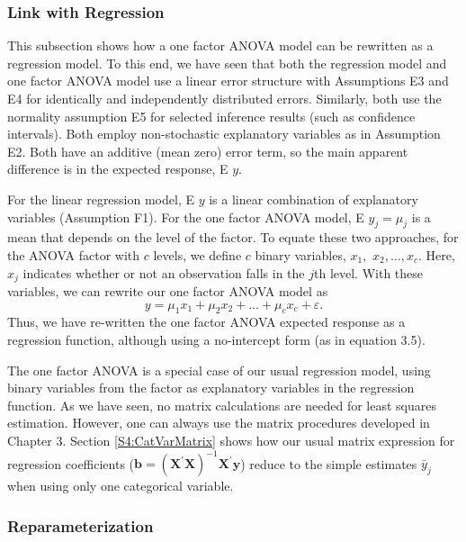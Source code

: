 \subsubsection*{Link with Regression}

This subsection shows how a one factor ANOVA model can be rewritten
as a regression model. To this end, we have seen that both the
regression model and one factor ANOVA model use a linear error
structure with Assumptions E3 and E4 for identically and
independently distributed errors. Similarly, both use the normality
assumption E5 for selected inference results (such as confidence
intervals). Both employ non-stochastic explanatory variables as in
Assumption E2. Both have an additive (mean zero) error term, so the
main apparent difference is in the expected response, E $y$.

For the linear regression model, E $y$ is a linear combination of
explanatory variables (Assumption F1). For the one factor ANOVA
model, E $y_j = \mu_j$ is a mean that depends on the level of the
factor. To equate these two approaches, for the ANOVA factor with
$c$ levels, we define $c$ binary variables, $x_1,$ $x_2,\ldots
,x_c$. Here, $x_j$ indicates whether or not an observation falls in
the $j$th level. With these variables, we can rewrite our one factor
ANOVA model as
\begin{equation}\label{E4:OneFactor}
y = \mu_1 x_1 + \mu_2 x_2 + \ldots + \mu_c x_c + \varepsilon.
\end{equation}
Thus, we have re-written the one factor ANOVA expected response as a
regression function, although using a no-intercept form (as in
equation 3.5).


The one factor ANOVA is a special case of our usual regression
model, using binary variables from the factor as explanatory
variables in the regression function. As we have seen, no matrix
calculations are needed for least squares estimation. However, one
can always use the matrix procedures developed in Chapter 3. Section
\ref{S4:CatVarMatrix} shows how our usual matrix expression for
regression coefficients ($\mathbf{b} =
\left(\mathbf{X}^{\prime}\mathbf{X}
\right)^{-1}\mathbf{X}^{\prime}\mathbf{y}$) reduce to the simple
estimates $\bar{y}_j$ when using only one categorical variable.

\subsubsection*{Reparameterization}

